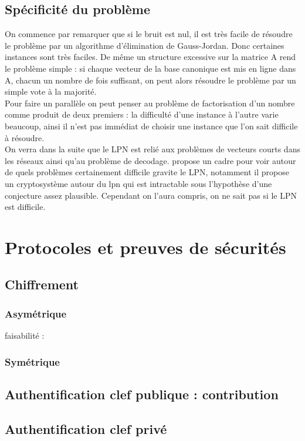 \documentclass{article}		%
\theoremstyle{definition}
\theoremstyle{plain}
\begin{document}
\subsection{Spécificité du problème}
On commence par remarquer que si le bruit est nul, il est très facile de
résoudre le problème par un algorithme d'élimination de Gauss-Jordan.
Donc certaines instances sont très faciles. De même un structure
excessive sur la matrice A rend le problème simple : si chaque vecteur de
la base canonique est mis en ligne dans A, chacun un nombre de fois
suffisant, on peut alors résoudre le problème par un simple vote à la 
majorité.
\\
Pour faire un parallèle on peut penser au problème de factorisation d'un
nombre comme produit de deux premiers : la difficulté d'une instance à
l'autre varie beaucoup, ainsi il n'est pas immédiat de choisir une instance
que l'on sait difficile à résoudre. 
\\
On verra dans la suite que le LPN est relié aux problèmes de vecteurs
courts dans les réseaux ainsi qu'au problème de decodage. \cite{Alekh}
propose un cadre pour voir autour de quels problèmes certainement
difficile gravite le LPN, notamment il propose un cryptosystème autour du
lpn qui est intractable sous l'hypothèse d'une conjecture assez
plausible. Cependant on l'aura compris, on ne sait pas si le LPN est
difficile.

\section{Protocoles et preuves de sécurités}
\subsection{Chiffrement}
\subsubsection{Asymétrique}
\cite{Alekh} faisabilité : \cite{Dam} 
\subsubsection{Symétrique}

\subsection{Authentification clef publique : contribution }
\subsection{Authentification clef privé}
\end{document}

